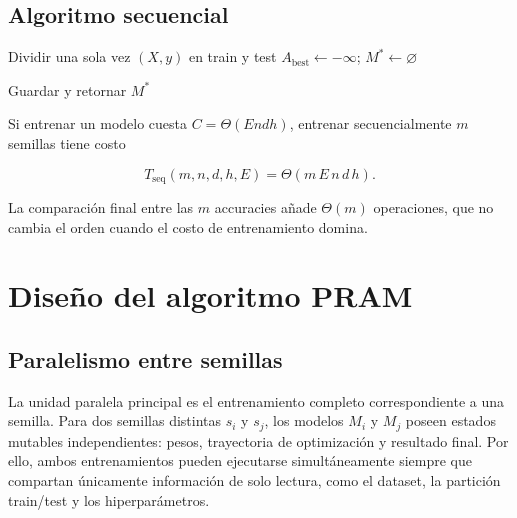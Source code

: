 \documentclass[11pt,a4paper]{article}
\newcommand{\Tseq}{T_{\mathrm{seq}}}
\newcommand{\Cost}{C}
\begin{document}
\subsection{Algoritmo secuencial}

\begin{algorithm}[H]
\caption{Entrenamiento secuencial de múltiples MLP con semillas distintas}
\label{alg:secuencial}

Dividir una sola vez $(X,y)$ en train y test\;
$A_{\mathrm{best}}\leftarrow -\infty$; $M^*\leftarrow \varnothing$\;

Guardar y retornar $M^*$\;
\end{algorithm}

Si entrenar un modelo cuesta $\Cost=\Theta(E n d h)$, entrenar secuencialmente
$m$ semillas tiene costo

\begin{equation}
    \Tseq(m,n,d,h,E)=\Theta(m\,E\,n\,d\,h).
    \label{eq:tseq-general}
\end{equation}

La comparación final entre las $m$ accuracies añade $\Theta(m)$ operaciones, que no
cambia el orden cuando el costo de entrenamiento domina.

\section{Diseño del algoritmo PRAM}

\subsection{Paralelismo entre semillas}

La unidad paralela principal es el entrenamiento completo correspondiente a una semilla.
Para dos semillas distintas $s_i$ y $s_j$, los modelos $M_i$ y $M_j$ poseen estados
mutables independientes: pesos, trayectoria de optimización y resultado final. Por ello,
ambos entrenamientos pueden ejecutarse simultáneamente siempre que compartan únicamente
información de solo lectura, como el dataset, la partición train/test y los hiperparámetros.
\end{document}
